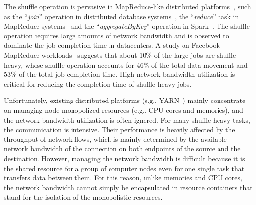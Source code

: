 \documentclass[10pt,journal,compsoc]{IEEEtran}
\begin{document}



 

The shuffle operation is pervasive in MapReduce-like distributed platforms~\cite{dean2008mapreduce,hindman2011mesos}, 
such as the ``\emph{join}'' operation in distributed database systems~\cite{thusoo2009hive, Yu:2008:DSG,Armbrust:2015:SSR}, 
the ``\emph{reduce}'' task in MapReduce systems~\cite{dean2008mapreduce,vavilapalli2013apache}
and the ``\emph{aggregateByKey}'' operation in Spark~\cite{zaharia2012resilient}.
The shuffle operation requires large amounts of network bandwidth 
and is observed to dominate the job completion time in datacenters.
A study on Facebook MapReduce workloads~\cite{chen2012interactive} suggests that
about 10\% of the large jobs are shuffle-heavy, whose shuffle operation accounts for
46\% of the total data movement and 53\% of the total job completion time. 
High network bandwidth utilization is critical for %
reducing the completion time of 
shuffle-heavy jobs.

Unfortunately, existing distributed platforms (e.g., YARN~\cite{vavilapalli2013apache}) mainly concentrate on
managing node-monopolized resources (e.g., CPU cores and memories),
and the network bandwidth utilization is often ignored.  
For many shuffle-heavy tasks, the communication is intensive.
Their performance is heavily 
affected by the throughput of network flows,
which is
mainly determined by the available network bandwidth of
the connection on both endpoints of the source and the destination. 
However, managing the network bandwidth is difficult because it is the shared resource for a group of computer nodes even for one single task that transfers data between them. 
For this reason, unlike memories and CPU cores, the network bandwidth cannot simply be encapsulated in resource containers that stand for the isolation of the monopolistic resources.
\end{document}
